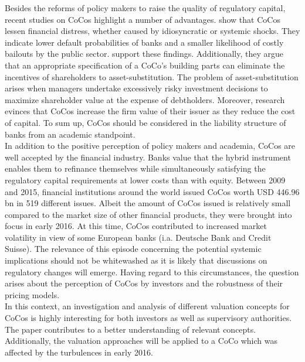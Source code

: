 Besides the reforms of policy makers to raise the quality of regulatory capital, recent studies on CoCos highlight a number of advantages. \citet{albul2015contingent} show that CoCos lessen financial distress, whether caused by idiosyncratic or systemic shocks. They indicate lower default probabilities of banks and a smaller likelihood of costly bailouts by the public sector. \citet{hilscher2014bank} support these findings. Additionally, they argue that an appropriate specification of a CoCo's building parts can eliminate the incentives of shareholders to asset-substitution. The problem of asset-substitution arises when managers undertake excessively risky investment decisions to maximize shareholder value at the expense of debtholders. \citep{bannier2010} Moreover, research evinces that CoCos increase the firm value of their issuer as they reduce the cost of capital. \citep{albul2015contingent, von2011contingent, barucci2012countercyclical} To sum up, CoCos should be considered in the liability structure of banks from an academic standpoint.\\ 

In addition to the positive perception of policy makers and academia, CoCos are well accepted by the financial industry. Banks value that the hybrid instrument enables them to refinance themselves while simultaneously satisfying the regulatory capital requirements at lower costs than with equity. \citep{europeanparliament2016} Between 2009 and 2015, financial institutions around the world issued CoCos worth USD 446.96 bn in 519 different issues. \citep{avdjiev2015coco} Albeit the amount of CoCos issued is relatively small compared to the market size of other financial products, they were brought into focus in early 2016. At this time, CoCos contributed to increased market volatility in view of some European banks (i.a. Deutsche Bank and Credit Suisse). The relevance of this episode concerning the potential systemic implications should not be whitewashed as it is likely that discussions on regulatory changes will emerge. Having regard to this circumstances, the question arises about the perception of CoCos by investors and the robustness of their pricing models. \citep{europeanparliament2016} \\

In this context, an investigation and analysis of different valuation concepts for CoCos is highly interesting for both investors as well as supervisory authorities. The paper contributes to a better understanding of relevant concepts. Additionally, the valuation approaches will be applied to a CoCo which was affected by the turbulences in early 2016.

